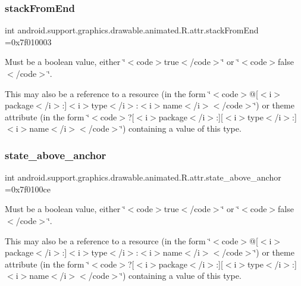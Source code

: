 \subsubsection{\texorpdfstring{stack\+From\+End}{stackFromEnd}}
{\footnotesize\ttfamily int android.\+support.\+graphics.\+drawable.\+animated.\+R.\+attr.\+stack\+From\+End =0x7f010003\hspace{0.3cm}{\ttfamily [static]}}

Must be a boolean value, either \char`\"{}$<$code$>$true$<$/code$>$\char`\"{} or \char`\"{}$<$code$>$false$<$/code$>$\char`\"{}. 

This may also be a reference to a resource (in the form \char`\"{}$<$code$>$@\mbox{[}$<$i$>$package$<$/i$>$\+:\mbox{]}$<$i$>$type$<$/i$>$\+:$<$i$>$name$<$/i$>$$<$/code$>$\char`\"{}) or theme attribute (in the form \char`\"{}$<$code$>$?\mbox{[}$<$i$>$package$<$/i$>$\+:\mbox{]}\mbox{[}$<$i$>$type$<$/i$>$\+:\mbox{]}$<$i$>$name$<$/i$>$$<$/code$>$\char`\"{}) containing a value of this type. \mbox{\label{classandroid_1_1support_1_1graphics_1_1drawable_1_1animated_1_1R_1_1attr_a9b6b1eba11e17dd6de7123f3ef08a692}} 
\subsubsection{\texorpdfstring{state\+\_\+above\+\_\+anchor}{state\_above\_anchor}}
{\footnotesize\ttfamily int android.\+support.\+graphics.\+drawable.\+animated.\+R.\+attr.\+state\+\_\+above\+\_\+anchor =0x7f0100ce\hspace{0.3cm}{\ttfamily [static]}}

Must be a boolean value, either \char`\"{}$<$code$>$true$<$/code$>$\char`\"{} or \char`\"{}$<$code$>$false$<$/code$>$\char`\"{}. 

This may also be a reference to a resource (in the form \char`\"{}$<$code$>$@\mbox{[}$<$i$>$package$<$/i$>$\+:\mbox{]}$<$i$>$type$<$/i$>$\+:$<$i$>$name$<$/i$>$$<$/code$>$\char`\"{}) or theme attribute (in the form \char`\"{}$<$code$>$?\mbox{[}$<$i$>$package$<$/i$>$\+:\mbox{]}\mbox{[}$<$i$>$type$<$/i$>$\+:\mbox{]}$<$i$>$name$<$/i$>$$<$/code$>$\char`\"{}) containing a value of this type. \mbox{\label{classandroid_1_1support_1_1graphics_1_1drawable_1_1animated_1_1R_1_1attr_a909896bc8ac0425ac86276ba585a5277}} 
